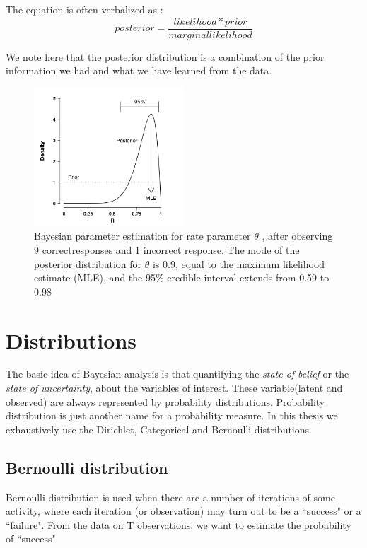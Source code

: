 The equation is often verbalized as :
\begin{equation}
	posterior = \frac{likelihood * prior}{marginal likelihood}
\end{equation}

We note here that the posterior distribution is a combination of the prior information we had and what we have learned from the data. 

\begin{figure}[htp]
\centering
\includegraphics[width=0.5\textwidth]{images/bayes.png}
\caption[Bayesian parameter estimation]{Bayesian parameter estimation for rate parameter $\theta$
, after observing 9 correctresponses and 1 incorrect response. The mode of the posterior distribution for $\theta$ is 0.9, equal to the maximum likelihood estimate (MLE), and the 95\% credible interval extends from 0.59 to 0.98}
\label{fig: bayes}
\end{figure}


\section{Distributions }

The basic idea of Bayesian analysis is that quantifying the \emph{state of belief} or the \emph{state of uncertainty}, about the variables of interest. These variable(latent and observed) are always represented by probability distributions.  Probability distribution is just another name for a probability measure.  In this thesis we exhaustively use the Dirichlet, Categorical and Bernoulli distributions. 
 

\subsection*{Bernoulli distribution}
Bernoulli distribution is used when there are a number of iterations of some activity, where each iteration (or observation) may turn out to be a ``success" or a ``failure". From the data on T observations, we want to estimate the probability of ``success"


